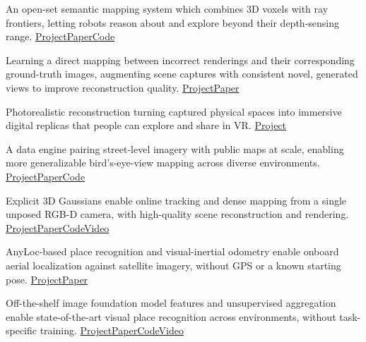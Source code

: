   {An open-set semantic mapping system which combines 3D voxels with ray frontiers, letting robots reason about and explore beyond their depth-sensing range.}
  {\href{https://rayfronts.github.io/}{Project}\linksep \href{https://arxiv.org/abs/2504.06994}{Paper}\linksep \href{https://github.com/RayFronts/RayFronts}{Code}}

  {Learning a direct mapping between incorrect renderings and their corresponding ground-truth images, augmenting scene captures with consistent novel, generated views to improve reconstruction quality.}
  {\href{https://tobiasfshr.github.io/pub/flowr/}{Project}\linksep \href{https://arxiv.org/abs/2504.01647}{Paper}}

  {Photorealistic reconstruction turning captured physical spaces into immersive digital replicas that people can explore and share in VR.}
  {\href{https://www.meta.com/blog/hyperscape-worlds-sharing-hangout-friends-metaverse-digital-replicas/}{Project}}

  {A data engine pairing street-level imagery with public maps at scale, enabling more generalizable bird’s-eye-view mapping across diverse environments.}
  {\href{https://mapitanywhere.github.io/}{Project}\linksep \href{https://arxiv.org/abs/2407.08726}{Paper}\linksep \href{https://github.com/MapItAnywhere/MapItAnywhere}{Code}}

  {Explicit 3D Gaussians enable online tracking and dense mapping from a single unposed RGB-D camera, with high-quality scene reconstruction and rendering.}
  {\href{https://spla-tam.github.io/}{Project}\linksep \href{https://arxiv.org/abs/2312.02126}{Paper}\linksep \href{https://github.com/spla-tam/SplaTAM}{Code}\linksep \href{https://youtu.be/jWLI-OFp3qU}{Video}}

  {AnyLoc-based place recognition and visual-inertial odometry enable onboard aerial localization against satellite imagery, without GPS or a known starting pose.}
  {\href{https://anyloc.github.io/FoundLoc/}{Project}\linksep \href{https://arxiv.org/abs/2310.16299}{Paper}}

  {Off-the-shelf image foundation model features and unsupervised aggregation enable state-of-the-art visual place recognition across environments, without task-specific training.}
  {\href{https://anyloc.github.io/}{Project}\linksep \href{https://arxiv.org/abs/2308.00688}{Paper}\linksep \href{https://github.com/AnyLoc/AnyLoc}{Code}\linksep \href{https://youtu.be/ITo8rMInatk}{Video}}

